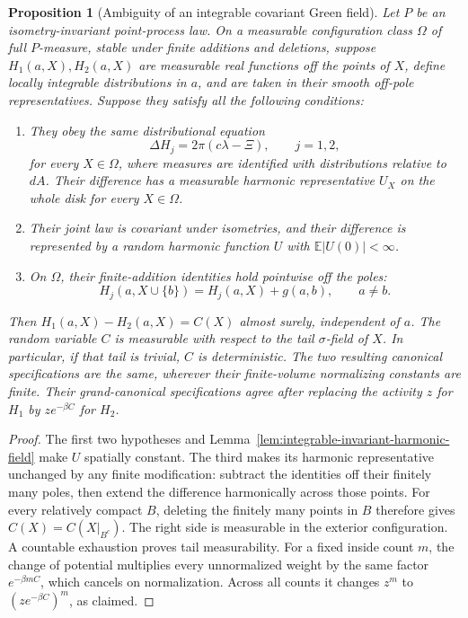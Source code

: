 \documentclass[11pt,a4paper]{article}
\numberwithin{equation}{section}
\newtheorem{proposition}[theorem]{Proposition}
\theoremstyle{definition}
\theoremstyle{remark}
\newcommand{\E}{\mathbb E}
\begin{document}
\begin{proposition}[Ambiguity of an integrable covariant Green field]
\label{prop:covariant-green-field-ambiguity}
Let $P$ be an isometry-invariant point-process law.  On a measurable
configuration class $\Omega$ of full $P$-measure, stable under finite
additions and deletions, suppose $H_1(a,X),H_2(a,X)$ are measurable
real functions off the points of $X$, define locally integrable
distributions in $a$, and are taken in their smooth off-pole
representatives.  Suppose they satisfy all the following conditions:
\begin{enumerate}
\item They obey the same distributional equation
\[
 \Delta H_j=2\pi(c\lambda-\Xi),\qquad j=1,2,
\]
for every $X\in\Omega$, where measures are identified with
distributions relative to $dA$.  Their difference has a measurable
harmonic representative $U_X$ on the whole disk for every
$X\in\Omega$.
\item Their joint law is covariant under isometries, and their
difference is represented by a random harmonic function $U$ with
$\E|U(0)|<\infty$.
\item On $\Omega$, their finite-addition identities hold pointwise
off the poles:
\[
 H_j(a,X\cup\{b\})=H_j(a,X)+g(a,b),\qquad a\ne b.
\]
\end{enumerate}
Then $H_1(a,X)-H_2(a,X)=C(X)$ almost surely, independent of $a$.
The random variable $C$ is measurable with respect to the tail
$\sigma$-field of $X$.  In particular, if that tail is trivial,
$C$ is deterministic.  The two resulting canonical specifications
are the same, wherever their finite-volume normalizing constants
are finite.  Their grand-canonical specifications agree after
replacing the activity $z$ for $H_1$ by $z e^{-\beta C}$ for $H_2$.
\end{proposition}

\begin{proof}
The first two hypotheses and
Lemma~\ref{lem:integrable-invariant-harmonic-field} make $U$ spatially
constant.  The third makes its harmonic representative unchanged by
any finite modification: subtract the identities off their finitely
many poles, then extend the difference harmonically across those
points.  For every relatively compact $B$, deleting the finitely
many points in $B$ therefore gives
$C(X)=C(X\vert_{B^c})$.  The right side is measurable in the
exterior configuration.  A countable exhaustion proves tail
measurability.  For a fixed inside count $m$, the change of potential
multiplies every unnormalized weight by the same factor
$e^{-\beta mC}$, which cancels on normalization.  Across all
counts it changes $z^m$ to $(ze^{-\beta C})^m$, as claimed.
\end{proof}
\end{document}

